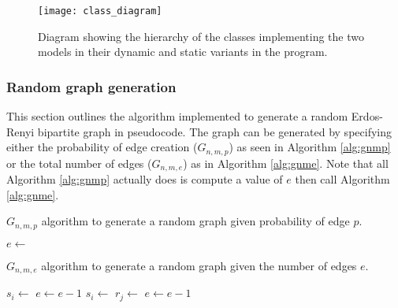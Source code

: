 \begin{figure}
  \centering
  \texttt{[image: class\_diagram]}
  \caption{Diagram showing the hierarchy of the classes implementing the two models in their dynamic and static variants in the \CC{} program.}
  \label{fig:class-diagram}
\end{figure}

\subsubsection{Random graph generation}

This section outlines the algorithm implemented to generate a random Erdos-Renyi bipartite graph in pseudocode.
The graph can be generated by specifying either the probability of edge creation ($G_{n,m,p}$) as seen in Algorithm \ref{alg:gnmp} or the total number of edges ($G_{n,m,e}$) as in Algorithm \ref{alg:gnme}.
Note that all Algorithm \ref{alg:gnmp} actually does is compute a value of $e$ then call Algorithm \ref{alg:gnme}.


\begin{algorithm}
  \caption{$G_{n,m,p}$ algorithm to generate a random \nbym{} graph given probability of edge $p$.} \label{alg:gnmp}
\begin{algorithmic}[1]
    \State $e \gets$ 
    \State \Return {}
  \EndProcedure
\end{algorithmic}
\end{algorithm}

\begin{algorithm}
  \caption{$G_{n,m,e}$ algorithm to generate a random \nbym{} graph given the number of edges $e$.} \label{alg:gnme}
  \begin{algorithmic}[1]
          \State $s_i \gets$ 
          \State {}
          \State $e \gets e - 1$
        \EndFor
      \EndIf
        \State $s_i \gets$ 
        \State $r_j \gets$ 
        \State {}
        \State $e \gets e - 1$
      \EndWhile
    \EndProcedure  
  \end{algorithmic}
\end{algorithm}

